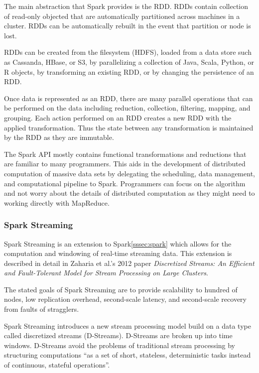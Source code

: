 \documentclass[]{article}
\begin{document}
The main abstraction that Spark provides is the RDD. RDDs contain collection of read-only objected that are automatically partitioned across machines in a cluster. RDDs can be automatically rebuilt in the event that partition or node is lost. 

RDDs can be created from the filesystem (HDFS), loaded from a data store such as Cassanda, HBase, or S3, by parallelizing a collection of Java, Scala, Python, or R objects, by transforming an existing RDD, or by changing the persistence of an RDD. 

Once data is represented as an RDD, there are many parallel operations that can be performed on the data including reduction, collection, filtering, mapping, and grouping. Each action performed on an RDD creates a new RDD with the applied transformation. Thus the state between any transformation is maintained by the RDD as they are immutable.

The Spark API mostly contains functional transformations and reductions that are familiar to many programmers. This aids in the development of distributed computation of massive data sets by delegating the scheduling, data management, and computational pipeline to Spark. Programmers can focus on the algorithm and not worry about the details of distributed computation as they might need to working directly with MapReduce.

\subsubsection{Spark Streaming}\label{sssec:spark-streaming}
Spark Streaming is an extension to Spark\ref{sssec:spark} which allows for the computation and windowing of real-time streaming data. This extension is described in detail in Zaharia et al.'s 2012 paper \textit{Discretized Streams: An Efficient and Fault-Tolerant Model for Stream Processing on Large Clusters}\cite{zaharia2012discretized}.

The stated goals of Spark Streaming are to provide scalability to hundred of nodes, low replication overhead, second-scale latency, and second-scale recovery from faults of stragglers.

Spark Streaming introduces a new stream processing model build on a data type called discretized streams (D-Streams). D-Streams are broken up into time windows. D-Streams avoid the problems of traditional stream processing by structuring computations ``as a set of short, stateless, deterministic tasks instead of continuous, stateful operations''.
\end{document}
